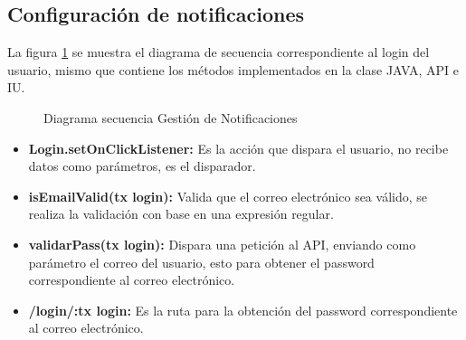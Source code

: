 \subsection{Configuración de notificaciones}

La figura \ref{fig:GestionNotifica} se muestra el diagrama de secuencia correspondiente al login del usuario, mismo que contiene los métodos implementados en la clase JAVA, API e IU.

\begin{figure}[htbp!]
	\centering
	\caption{Diagrama secuencia Gestión de Notificaciones}
	\label{fig:GestionNotifica}
\end{figure}
\begin{itemize}
	\item \textbf{Login.setOnClickListener:} Es la acción que dispara el usuario, no recibe datos como parámetros, es el disparador.
	\item \textbf{isEmailValid(tx login):} Valida que el correo electrónico sea válido, se realiza la validación con base en una expresión regular.
	\item \textbf{validarPass(tx login):} Dispara una petición al API, enviando como parámetro el correo del usuario, esto para obtener el password correspondiente al correo electrónico.
	\item \textbf{/login/:tx login:} Es la ruta para la obtención del password correspondiente al correo electrónico.
\end{itemize}